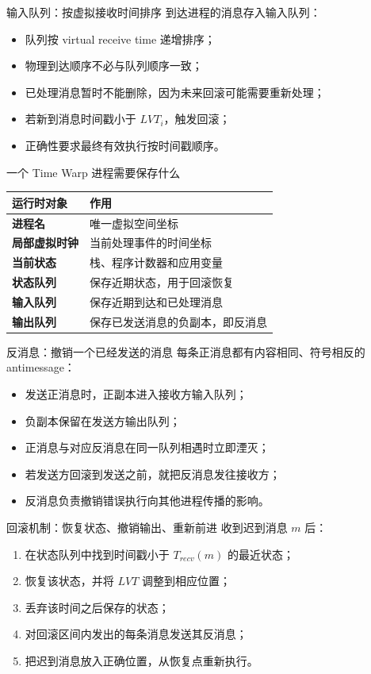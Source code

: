 \documentclass[UTF8,fontset=none,aspectratio=169,10pt]{beamer}
\begin{document}
\begin{frame}{输入队列：按虚拟接收时间排序}
到达进程的消息存入输入队列：
\begin{itemize}
  \item 队列按 virtual receive time 递增排序；
  \item 物理到达顺序不必与队列顺序一致；
  \item 已处理消息暂时不能删除，因为未来回滚可能需要重新处理；
  \item 若新到消息时间戳小于 $LVT_i$，触发回滚；
  \item 正确性要求最终有效执行按时间戳顺序。
\end{itemize}
\end{frame}

\begin{frame}{一个 Time Warp 进程需要保存什么}
\begin{tabularx}{\linewidth}{>{\bfseries}p{2.6cm}X}
\toprule
运行时对象 & 作用 \\
\midrule
进程名 & 唯一虚拟空间坐标 \\
局部虚拟时钟 & 当前处理事件的时间坐标 \\
当前状态 & 栈、程序计数器和应用变量 \\
状态队列 & 保存近期状态，用于回滚恢复 \\
输入队列 & 保存近期到达和已处理消息 \\
输出队列 & 保存已发送消息的负副本，即反消息 \\
\bottomrule
\end{tabularx}
\vfill
{}
\end{frame}

\begin{frame}{反消息：撤销一个已经发送的消息}
每条正消息都有内容相同、符号相反的 antimessage：
\begin{itemize}
  \item 发送正消息时，正副本进入接收方输入队列；
  \item 负副本保留在发送方输出队列；
  \item 正消息与对应反消息在同一队列相遇时立即湮灭；
  \item 若发送方回滚到发送之前，就把反消息发往接收方；
  \item 反消息负责撤销错误执行向其他进程传播的影响。
\end{itemize}
\end{frame}

\begin{frame}{回滚机制：恢复状态、撤销输出、重新前进}
收到迟到消息 $m$ 后：
\begin{enumerate}
  \item 在状态队列中找到时间戳小于 $T_{recv}(m)$ 的最近状态；
  \item 恢复该状态，并将 $LVT$ 调整到相应位置；
  \item 丢弃该时间之后保存的状态；
  \item 对回滚区间内发出的每条消息发送其反消息；
  \item 把迟到消息放入正确位置，从恢复点重新执行。
\end{enumerate}
\vfill
{}
\end{frame}
\end{document}
